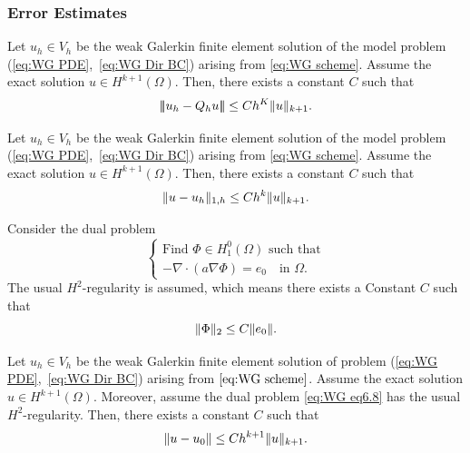 	\subsubsection*{Error Estimates}
	\begin{theorem}
	Let $u_h\in V_h$ be the weak Galerkin finite element solution of the
	model problem (\ref{eq:WG PDE},~\ref{eq:WG Dir BC}) arising from
	\eqref{eq:WG scheme}. Assume the exact solution $u\in H^{k+1}(\Omega)$.
	Then, there exists a constant $C$ such that
	\begin{equation}\label{eq:WG eq6.5}
		{\left\vert\kern-0.4ex\left\vert\kern-0.4ex\left\vert u_h-Q_h u \right\vert\kern-0.4ex\right\vert\kern-0.4ex\right\vert}\leq Ch^K \lVert u\rVert_{k+1}.
	\end{equation}	
	\end{theorem}
	
	\begin{corollary}
	Let $u_h\in V_h$ be the weak Galerkin finite element solution of the model
	problem (\ref{eq:WG PDE},~\ref{eq:WG Dir BC}) arising from 
	\eqref{eq:WG scheme}. Assume the exact solution $u\in H^{k+1}(\Omega)$.
	Then, there exists a constant $C$ such that 
	\begin{equation}
		\lVert u-u_h\rVert_{1,h}\leq Ch^k\lVert u\rVert_{k+1}.		
	\end{equation}
	\end{corollary}
	
	Consider the dual problem 
	\begin{equation}\label{eq:WG eq6.8}
		\begin{cases}
			\textrm{Find }\Phi\in H_1^0(\Omega) \textrm{ such that}\\
			-\nabla\cdot(a\nabla\Phi)=e_0 \quad \textrm{in } \Omega.
		\end{cases}
	\end{equation}
	The usual $H^2$-regularity is assumed, which
	means there  exists a Constant $C$ such that
	\begin{equation}
		\lVert\Phi\rVert_2 \leq C\lVert e_0\rVert.
	\end{equation}
	
	\begin{theorem}
	Let $u_h\in V_h$ be the weak Galerkin finite element solution of problem
	(\ref{eq:WG PDE},~\ref{eq:WG Dir BC}) arising from $\eqref{eq:WG scheme}$.
	Assume the exact solution $u\in H^{k+1}(\Omega)$. Moreover, assume the
	dual problem \eqref{eq:WG eq6.8} has the usual $H^2$-regularity. Then,
	there exists a constant $C$ such that
	\begin{equation}
		\lVert u-u_0\rVert\leq Ch^{k+1}\lVert u\rVert_{k+1}.
	\end{equation}
	\end{theorem}

